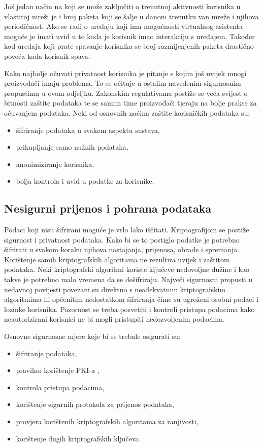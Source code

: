 \documentclass[times, utf8, diplomski]{fer}
\begin{document}
Još jedan način na koji se može zaključiti o trenutnoj aktivnosti korisnika u vlastitoj mreži je i broj paketa koji se šalje u danom trenutku van mreže i njihova periodičnost. Ako se radi o uređaju koji ima mogućnosti virtualnog asistenta moguće je imati uvid u to kada je korisnik imao interakciju s uređajem. Također kod uređaja koji prate spavanje korisnika se broj razmijenjenih paketa drastično poveća kada korisnik spava\citep{Apthorpe2017May}.

Kako najbolje očuvati privatnost korisnika je pitanje s kojim još uvijek mnogi proizvođači imaju problema. To se očituje u ostalim navedenim sigurnosnim propustima u ovom odjeljku. Zakonskim regulativama postiže se veća svijest o bitnosti zaštite podataka te se samim time proizvođači tjeraju na bolje prakse za očuvanjem podataka. Neki od osnovnih načina zaštite korisničkih podataka su: 
\begin{itemize}
    \item šifriranje podataka u svakom aspektu sustava,
    \item prikupljanje samo nužnih podataka,
    \item anonimiziranje korisnika,
    \item bolja kontrola i uvid u podatke za korisnike.
\end{itemize}

\subsection{Nesigurni prijenos i pohrana podataka}
Podaci koji nisu šifrirani moguće je vrlo lako iščitati. Kriptografijom se postiže sigurnost i privatnost podataka. Kako bi se to postiglo podatke je potrebno šifrirati u svakom koraku njihova nastajanja, prijenosa, obrade i spremanja. Korištenje samih kriptografskih algoritama ne rezultira uvijek i zaštitom podataka. Neki kriptografski algoritmi koriste ključeve nedovoljne dužine i kao takve je potrebno malo vremena da se dešifriraju. Najveći sigurnosni propusti u nedavnoj povijesti povezani su direktno s neadekvatnim kriptografskim algoritmima ili općenitim nedostatkom šifriranja čime su ugroženi osobni podaci i lozinke korisnika\citep{DataBreaches}. Pozornost se treba posvetiti i kontroli pristupa podacima kako neautorizirani korisnici ne bi mogli pristupiti nedozvoljenim podacima. 

Osnovne sigurnosne mjere koje bi se trebale osigurati su: \begin{itemize}
    \item šifriranje podataka,
    \item pravilno korištenje PKI-a ,
    \item kontrola pristupa podacima,
    \item korištenje sigurnih protokola za prijenos podataka,
    \item provjera korištenih kriptografskih algoritama za ranjivosti,
    \item korištenje dugih kriptografskih ključeva.
\end{itemize}     
\end{document}
